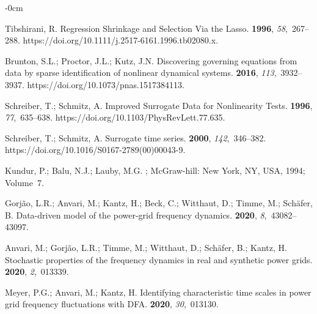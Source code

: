 \documentclass[entropy,article,accept,pdftex,moreauthors]{Definitions/mdpi}
\begin{document}
\begin{adjustwidth}{-\extralength}{0cm}
\begin{thebibliography}{999}
Tibshirani, R.
\newblock Regression Shrinkage and Selection Via the Lasso.
 {\bf 1996}, {\em 58},~267--288.
\newblock
 {https://doi.org/10.1111/\linebreak j.2517-6161.1996.tb02080.x}.

Brunton, S.L.; Proctor, J.L.; Kutz, J.N.
\newblock Discovering governing equations from data by sparse identification of
  nonlinear dynamical systems.
 {\bf 2016},
  {\em 113},~3932--3937.
\newblock
  {https://doi.org/10.1073/pnas.1517384113}.

Schreiber, T.; Schmitz, A.
\newblock Improved Surrogate Data for Nonlinearity Tests.
 {\bf 1996}, {\em 77},~635--638.
\newblock
 {https://doi.org/10.1103/PhysRevLett.77.635}.

Schreiber, T.; Schmitz, A.
\newblock Surrogate time series.
 {\bf 2000}, {\em 142},~346--382.
\newblock
 {https://doi.org/10.1016/S0167-2789(00)00043-9}.

Kundur, P.; Balu, N.J.; Lauby, M.G.
; McGraw-hill: New
  York, NY, USA, 1994; Volume~7.

Gorj{\~a}o, L.R.; Anvari, M.; Kantz, H.; Beck, C.; Witthaut, D.; Timme, M.;
  Sch{\"a}fer, B.
\newblock Data-driven model of the power-grid frequency dynamics.
 {\bf 2020}, {\em 8},~43082--43097.

Anvari, M.; Gorj{\~a}o, L.R.; Timme, M.; Witthaut, D.; Sch{\"a}fer, B.; Kantz,
  H.
\newblock Stochastic properties of the frequency dynamics in real and synthetic
  power grids.
 {\bf 2020}, {\em 2},~013339.

Meyer, P.G.; Anvari, M.; Kantz, H.
\newblock Identifying characteristic time scales in power grid frequency
  fluctuations with DFA.
 {\bf
  2020}, {\em 30},~013130.


\end{thebibliography}
\end{adjustwidth}
\end{document}
